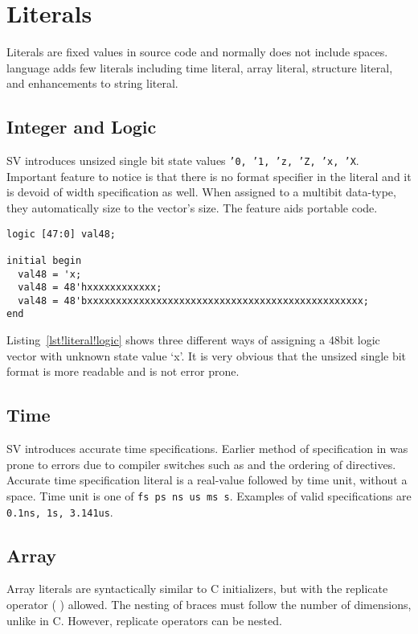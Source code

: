 \chapter{Literals}
Literals are fixed values in source code and normally does not
include spaces. \lsvlog language adds few literals including
time literal, array literal, structure literal, and
enhancements to string literal.

\section{Integer and Logic}
SV introduces unsized single bit state values \texttt{'0, '1, 'z, 'Z,
  'x, 'X}. Important feature to notice is that there is no format
specifier in the literal and it is devoid of width specification as
well. When assigned to a multibit data-type, they automatically size
to the vector's size. The feature aids portable code.
\begin{lstlisting}[label=lst!literal!logic,caption=Unsized literal usage]
logic [47:0] val48;

initial begin
  val48 = 'x;
  val48 = 48'hxxxxxxxxxxxx;
  val48 = 48'bxxxxxxxxxxxxxxxxxxxxxxxxxxxxxxxxxxxxxxxxxxxxxxxx;
end
\end{lstlisting}
Listing~\ref{lst!literal!logic} shows three different ways of
assigning a 48bit logic vector with unknown state value `x'. It is
very obvious that the unsized single bit format is more readable and
is not error prone.

\section{Time}
SV introduces accurate time specifications. Earlier method of
specification in \lvlog was prone to errors due to compiler
switches such as  and the ordering of
 directives. Accurate time specification literal is a
real-value followed by time unit, without a space. Time unit is one of
\texttt{fs ps ns us ms s}. Examples of valid specifications are
\texttt{0.1ns, 1s, 3.141us}.

\section{Array}
Array literals are syntactically similar to C initializers, but with
the replicate operator ( {{}} ) allowed.  The nesting of braces must
follow the number of dimensions, unlike in C. However, replicate
operators can be nested.

